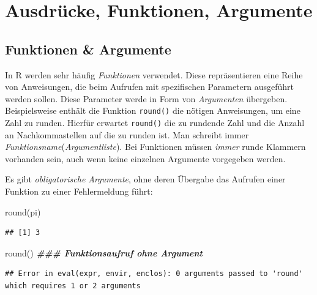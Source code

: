 \documentclass[
]{book}
\newenvironment{Shaded}{\begin{snugshade}}{\end{snugshade}}
\newcommand{\DocumentationTok}[1]{\textcolor[rgb]{0.56,0.35,0.01}{\textbf{\textit{#1}}}}
\newcommand{\FunctionTok}[1]{\textcolor[rgb]{0.00,0.00,0.00}{#1}}
\newcommand{\NormalTok}[1]{#1}
\begin{document}
\hypertarget{ausdruxfccke-funktionen-argumente}{%
\section{Ausdrücke, Funktionen, Argumente}\label{ausdruxfccke-funktionen-argumente}}

\hypertarget{funktionen-argumente}{%
\subsection*{Funktionen \& Argumente}\label{funktionen-argumente}}

In R werden sehr häufig \emph{Funktionen} verwendet. Diese repräsentieren eine Reihe von Anweisungen, die beim Aufrufen mit spezifischen Parametern ausgeführt werden sollen. Diese Parameter werde in Form von \emph{Argumenten} übergeben.
Beispielsweise enthält die Funktion \texttt{round()} die nötigen Anweisungen, um eine Zahl zu runden. Hierfür erwartet \texttt{round()} die zu rundende Zahl und die Anzahl an Nachkommastellen auf die zu runden ist.
Man schreibt immer \emph{Funktionsname}(\emph{Argumentliste}). Bei Funktionen müssen \emph{immer} runde Klammern vorhanden sein, auch wenn keine einzelnen Argumente vorgegeben werden.

Es gibt \emph{obligatorische Argumente}, ohne deren Übergabe das Aufrufen einer Funktion zu einer Fehlermeldung führt:

\begin{Shaded}
\begin{Highlighting}[]
\FunctionTok{round}\NormalTok{(pi)}
\end{Highlighting}
\end{Shaded}

\begin{verbatim}
## [1] 3
\end{verbatim}

\begin{Shaded}
\begin{Highlighting}[]
\FunctionTok{round}\NormalTok{() }\DocumentationTok{\#\#\# Funktionsaufruf ohne Argument}
\end{Highlighting}
\end{Shaded}

\begin{verbatim}
## Error in eval(expr, envir, enclos): 0 arguments passed to 'round' which requires 1 or 2 arguments
\end{verbatim}
\end{document}
